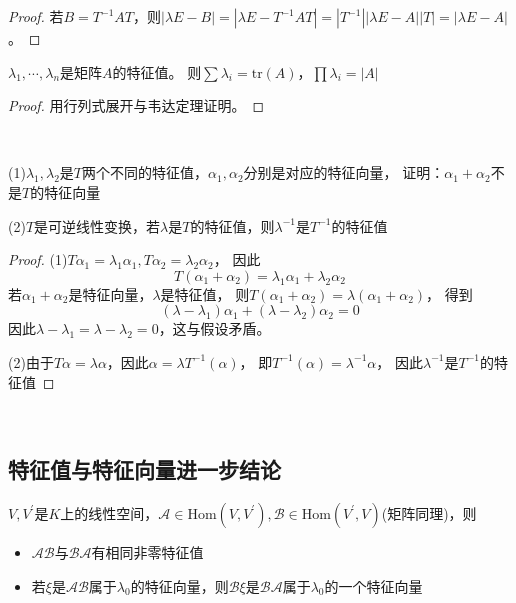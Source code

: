 \begin{proof}
  若$B = T^{-1}AT$，则$|\lambda E - B| = |\lambda E - T^{-1}AT|
  = |T^{-1}||\lambda E - A||T| = |\lambda E - A|$。
\end{proof}

\begin{theorem}[特征值基本性质]
  $\lambda_1,\cdots,\lambda_n$是矩阵$A$的特征值。
  则$\sum \lambda_i = \mathrm{tr}(A)$，$\prod \lambda_i =  |A|$
\end{theorem}

\begin{proof}
  用行列式展开与韦达定理证明。
\end{proof}

~

\begin{exercise}[特征值与特征向量的基本练习]
  (1)$\lambda_1,\lambda_2$是$T$两个不同的特征值，$\alpha_1,\alpha_2$分别是对应的特征向量，
  证明：$\alpha_1 + \alpha_2$不是$T$的特征向量

  (2)$T$是可逆线性变换，若$\lambda$是$T$的特征值，则$\lambda^{-1}$是$T^{-1}$的特征值
\end{exercise}

\begin{proof}
  (1)$T\alpha_1 = \lambda_1\alpha_1, T\alpha_2 = \lambda_2\alpha_2$，
  因此
  \begin{equation*}
    T(\alpha_1 + \alpha_2) = \lambda_1 \alpha_1 + \lambda_2 \alpha_2
  \end{equation*}
  若$\alpha_1 + \alpha_2$是特征向量，$\lambda$是特征值，
  则$T(\alpha_1 + \alpha_2) = \lambda(\alpha_1 + \alpha_2)$，
  得到
  \begin{equation*}
    (\lambda - \lambda_1)\alpha_1 + (\lambda - \lambda_2)\alpha_2 = 0
  \end{equation*}
  因此$\lambda - \lambda_1 = \lambda - \lambda_2 = 0$，这与假设矛盾。

  (2)由于$T\alpha = \lambda \alpha$，因此$\alpha = \lambda T^{-1}(\alpha)$，
  即$T^{-1}(\alpha) = \lambda^{-1}\alpha$，
  因此$\lambda^{-1}$是$T^{-1}$的特征值
\end{proof}

~


\subsection{特征值与特征向量进一步结论}

\begin{theorem}
  $V,V^{\prime}$是$K$上的线性空间，$\mathcal{A} \in \mathrm{Hom}(V,V^{\prime}), \mathcal{B} \in \mathrm{Hom}(V^{\prime},V)$(矩阵同理)，则
  \begin{itemize}
  \item $\mathcal{A}\mathcal{B}$与$\mathcal{B}\mathcal{A}$有相同非零特征值
  \item 若$\xi$是$\mathcal{A}\mathcal{B}$属于$\lambda_0$的特征向量，则$\mathcal{B}\xi$是$\mathcal{B}\mathcal{A}$属于$\lambda_0$的一个特征向量
  \end{itemize}
\end{theorem}

